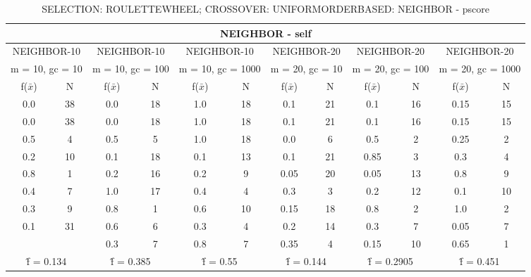 \begin{table}[H]
	\centering
	\caption{SELECTION: ROULETTEWHEEL; CROSSOVER: UNIFORMORDERBASED: NEIGHBOR - pscore}
	\begin{adjustbox}{width=1\textwidth}
		\begin{tabular}{ |c|c||c|c||c|c||c|c||c|c||c|c| }
			\hline
			\multicolumn{12}{|c|}{NEIGHBOR - self} \\
			\hline
			\multicolumn{2}{|c||}{NEIGHBOR-10} & \multicolumn{2}{c||}{NEIGHBOR-10} & \multicolumn{2}{c||}{NEIGHBOR-10} & \multicolumn{2}{c||}{NEIGHBOR-20} & \multicolumn{2}{c||}{NEIGHBOR-20} & \multicolumn{2}{c|}{NEIGHBOR-20}\\
			\hline
			\multicolumn{2}{|c||}{m = 10, gc = 10} & \multicolumn{2}{c||}{m = 10, gc = 100} & \multicolumn{2}{c||}{m = 10, gc = 1000} & \multicolumn{2}{c||}{m = 20, gc = 10} & \multicolumn{2}{c||}{m = 20, gc = 100} & \multicolumn{2}{c|}{m = 20, gc = 1000}\\
			\hline
			f($\bar{x}$) & N & f($\bar{x}$) & N & f($\bar{x}$) & N & f($\bar{x}$) & N & f($\bar{x}$) & N & f($\bar{x}$) & N\\
			\hline
			\hline
			0.0 & 38 & 0.0 & 18 & 1.0 & 18 & 0.1 & 21 & 0.1 & 16 & 0.15 & 15\\
			\hline
			0.0 & 38 & 0.0 & 18 & 1.0 & 18 & 0.1 & 21 & 0.1 & 16 & 0.15 & 15\\
			0.5 & 4 & 0.5 & 5 & 1.0 & 18 & 0.0 & 6 & 0.5 & 2 & 0.25 & 2\\
			0.2 & 10 & 0.1 & 18 & 0.1 & 13 & 0.1 & 21 & 0.85 & 3 & 0.3 & 4\\
			0.8 & 1 & 0.2 & 16 & 0.2 & 9 & 0.05 & 20 & 0.05 & 13 & 0.8 & 9\\
			0.4 & 7 & 1.0 & 17 & 0.4 & 4 & 0.3 & 3 & 0.2 & 12 & 0.1 & 10\\
			0.3 & 9 & 0.8 & 1 & 0.6 & 10 & 0.15 & 18 & 0.8 & 2 & 1.0 & 2\\
			0.1 & 31 & 0.6 & 6 & 0.3 & 4 & 0.2 & 14 & 0.3 & 7 & 0.05 & 7\\
			&   & 0.3 & 7 & 0.8 & 7 & 0.35 & 4 & 0.15 & 10 & 0.65 & 1\\
			\hline
			\multicolumn{2}{|c||}{\^{f} = 0.134} & \multicolumn{2}{c||}{\^{f} = 0.385} & \multicolumn{2}{c||}{\^{f} = 0.55} & \multicolumn{2}{c||}{\^{f} = 0.144} & \multicolumn{2}{c||}{\^{f} = 0.2905} & \multicolumn{2}{c|}{\^{f} = 0.451}\\
			\hline
		\end{tabular}
	\end{adjustbox}
\end{table}
